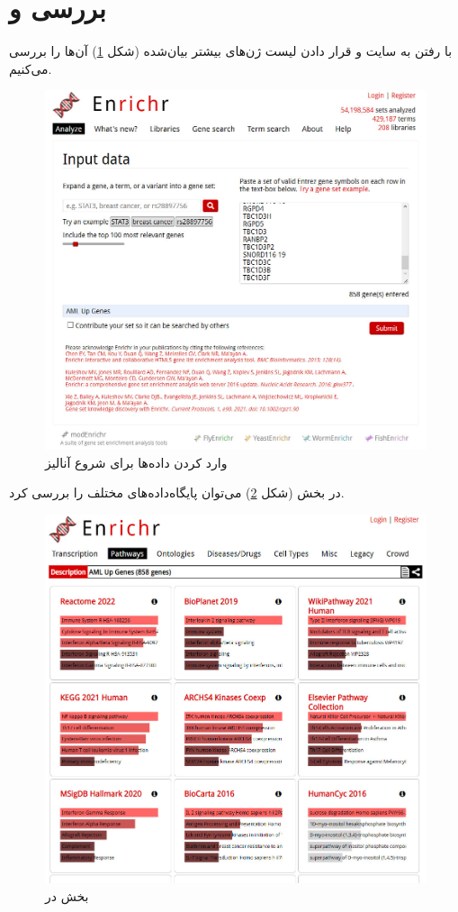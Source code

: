 \documentclass{article}
\begin{document}
\section{بررسی  و }
با رفتن به سایت \href{https://maayanlab.cloud/Enrichr/}{} و قرار دادن لیست ژن‌های بیشتر بیان‌شده (شکل \ref{fig:enrichr}) آن‌‌ها را بررسی می‌کنیم.
\begin{figure}[h!]
	\centering
	\includegraphics[width=0.5\columnwidth]{figs/enrichr.jpg}
	\caption{وارد کردن داده‌ها برای شروع آنالیز}
	\label{fig:enrichr}
\end{figure}

در بخش  (شکل \ref{fig:enrichr-pathways}) می‌توان پایگاه‌داده‌های  مختلف را بررسی کرد.
\begin{figure}[h!]
	\centering
	\includegraphics[width=0.5\columnwidth]{figs/enrichr-pathways.jpg}
	\caption{بخش  در }
	\label{fig:enrichr-pathways}
\end{figure}
\end{document}
